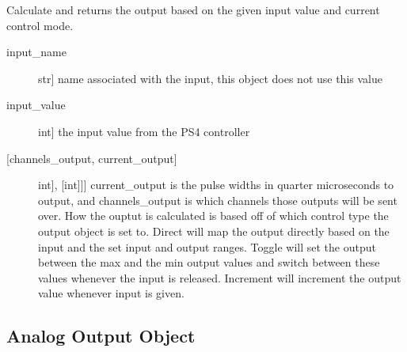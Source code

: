 \documentclass[letterpaper,10pt,english]{sphinxmanual}
\begin{document}
\begin{fulllineitems}
\begin{description}
\end{description}

\begin{fulllineitems}
\label{\detokenize{generic:DigitalOutputObject.DigitalOutputObject.get_output}}
\sphinxAtStartPar
Calculate and returns the output based on the given input value and current control mode.
\begin{description}
\item[{input\_name}] \leavevmode{[}str{]}
\sphinxAtStartPar
name associated with the input, this object does not use this value

\item[{input\_value}] \leavevmode{[}int{]}
\sphinxAtStartPar
the input value from the PS4 controller

\end{description}
\begin{description}
\item[{{[}channels\_output, current\_output{]}}] \leavevmode{[}{[}{[}int{]}, {[}int{]}{]}{]}
\sphinxAtStartPar
current\_output is the pulse widths in quarter microseconds to output, and channels\_output
is which channels those outputs will be sent over. How the ouptut is calculated is based
off of which control type the output object is set to. Direct will map the output directly
based on the input and the set input and output ranges. Toggle will set the output between
the max and the min output values and switch between these values whenever the input is
released. Increment will increment the output value whenever input is given.

\end{description}

\end{fulllineitems}


\end{fulllineitems}



\subsection{Analog Output Object}
\label{\detokenize{generic:module-AnalogOutputObject}}\label{\detokenize{generic:analog-output-object}}
\end{document}
